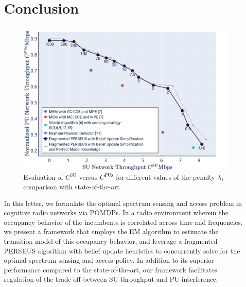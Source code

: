 \documentclass[10pt,twocolumn]{IEEEtran}
\begin{document}
\section{Conclusion}\label{V}
\begin{figure}
    \centering
    \includegraphics[width=0.78\linewidth]{SU_Throughput_PU_Interference_Varying_Penalty.png}
    \caption{Evaluation of $C^{\text{SU}}$ versus $C^{\text{PUs}}$ for different values of the penalty $\lambda$; comparison with state-of-the-art}
    \vspace{-5mm}
    \label{fig:8}
\end{figure}
In this letter, we formulate the optimal spectrum sensing and access problem in cognitive radio networks via POMDPs. In a radio environment wherein the occupancy behavior of the incumbents is correlated across time and frequencies, we present a framework that employs the EM algorithm to estimate the transition model of this occupancy behavior, and leverage a fragmented PERSEUS algorithm with belief update heuristics to concurrently solve for the optimal spectrum sensing and access policy. In addition to its superior performance compared to the state-of-the-art, our framework facilitates regulation of the trade-off between SU throughput and PU interference.

\vspace{-5mm}

\end{document}
